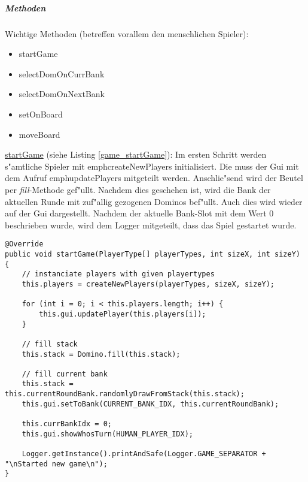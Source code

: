\subparagraph{Methoden}
Wichtige Methoden (betreffen vorallem den menschlichen Spieler): 
\begin{itemize}
	\item startGame
	\item selectDomOnCurrBank
	\item selectDomOnNextBank
	\item setOnBoard
	\item moveBoard
\end{itemize}

\underline{startGame} (siehe Listing \ref{game_startGame}): Im ersten Schritt werden s"amtliche Spieler mit emph{createNewPlayers} initialisiert. Die muss der Gui mit dem Aufruf emph{updatePlayers} mitgeteilt werden. Anschlie"send wird der Beutel per \emph{fill}-Methode gef"ullt. Nachdem dies geschehen ist, wird die Bank der aktuellen Runde mit zuf"allig gezogenen Dominos bef"ullt. Auch dies wird wieder auf der Gui dargestellt. Nachdem der aktuelle Bank-Slot mit dem Wert 0 beschrieben wurde, wird dem Logger mitgeteilt, dass das Spiel gestartet wurde. 
\begin{lstlisting}[float,style=CodeHighlighting,label=game_startGame,caption=Game - startGame]
@Override
public void startGame(PlayerType[] playerTypes, int sizeX, int sizeY) {
    // instanciate players with given playertypes
    this.players = createNewPlayers(playerTypes, sizeX, sizeY);

    for (int i = 0; i < this.players.length; i++) {
        this.gui.updatePlayer(this.players[i]);
    }

    // fill stack
    this.stack = Domino.fill(this.stack);

    // fill current bank
    this.stack = this.currentRoundBank.randomlyDrawFromStack(this.stack);
    this.gui.setToBank(CURRENT_BANK_IDX, this.currentRoundBank);

    this.currBankIdx = 0;
    this.gui.showWhosTurn(HUMAN_PLAYER_IDX);

    Logger.getInstance().printAndSafe(Logger.GAME_SEPARATOR + "\nStarted new game\n");
}
\end{lstlisting}

